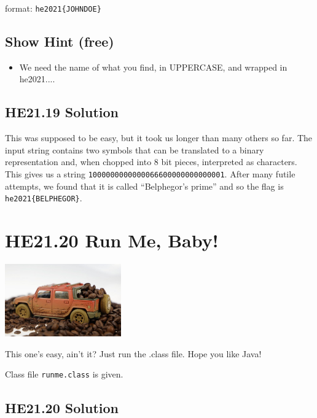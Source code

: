 \documentclass[english,a4paper,nols,noindent]{tufte-handout}
\begin{document}
 format: \verb+he2021{JOHNDOE}+

\subsection{Show Hint (free)}
\begin{itemize}
\item We need the name of what you find, in UPPERCASE, and wrapped in he2021{...}.
\end{itemize}


\hypertarget{he21.19-solution}{%
\subsection{HE21.19 Solution}\label{he21.19-solution}}

\noindent This was supposed to be easy, but it took us longer than
many others so far.  The input string contains two symbols that can be
translated to a binary representation and, when chopped into 8 bit
pieces, interpreted as characters.  This gives us a string
\verb+1000000000000066600000000000001+.  After many futile attempts,
we found that it is called ``Belphegor's prime'' and so the flag is
\verb+he2021{BELPHEGOR}+.

\hypertarget{he21.20}{%
  \section{HE21.20 Run Me, Baby!}
  \label{he21.20}}
\begin{marginfigure}
    \includegraphics[width=50mm]{images/challenge20.jpg}
\end{marginfigure}

This one's easy, ain't it? Just run the .class file. Hope you like Java!

\noindent Class file \verb+runme.class+ is given.

\hypertarget{he21.20-solution}{%
\subsection{HE21.20 Solution}\label{he21.20-solution}}
\end{document}
